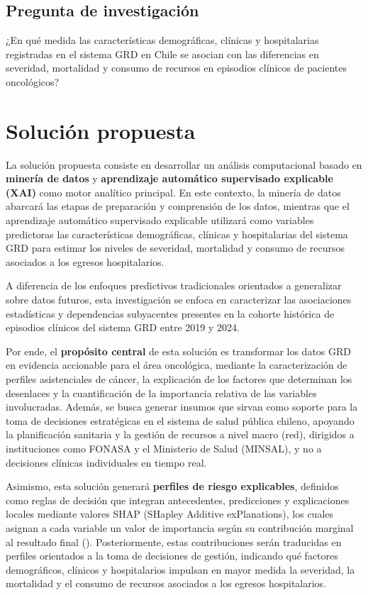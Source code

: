 \subsection{Pregunta de investigación}
\label{intro:pregunta_investigacion}
¿En qué medida las características demográficas, clínicas y hospitalarias registradas en el sistema GRD en Chile se asocian con las diferencias en severidad, mortalidad y consumo de recursos en episodios clínicos de pacientes oncológicos?

\section{Soluci\'on propuesta}
\label{intro:solucion}
La solución propuesta consiste en desarrollar un análisis computacional basado en \textbf{minería de datos} y \textbf{aprendizaje automático supervisado explicable (XAI)} como motor analítico principal. En este contexto, la minería de datos abarcará las etapas de preparación y comprensión de los datos, mientras que el aprendizaje automático supervisado explicable utilizará como variables predictoras las características demográficas, clínicas y hospitalarias del sistema GRD para estimar los niveles de severidad, mortalidad y consumo de recursos asociados a los egresos hospitalarios.

A diferencia de los enfoques predictivos tradicionales orientados a generalizar sobre datos futuros, esta investigación se enfoca en caracterizar las asociaciones estadísticas y dependencias subyacentes presentes en la cohorte histórica de episodios clínicos del sistema GRD entre 2019 y 2024.

Por ende, el \textbf{propósito central} de esta solución es transformar los datos GRD en evidencia accionable para el área oncológica, mediante la caracterización de perfiles asistenciales de cáncer, la explicación de los factores que determinan los desenlaces y la cuantificación de la importancia relativa de las variables involucradas. Además, se busca generar insumos que sirvan como soporte para la toma de decisiones estratégicas en el sistema de salud pública chileno, apoyando la planificación sanitaria y la gestión de recursos a nivel macro (red), dirigidos a instituciones como FONASA y el Ministerio de Salud (MINSAL), y no a decisiones clínicas individuales en tiempo real.


Asimismo, esta solución generará \textbf{perfiles de riesgo explicables}, definidos como reglas de decisión que integran antecedentes, predicciones y explicaciones locales mediante valores SHAP (SHapley Additive exPlanations), los cuales asignan a cada variable un valor de importancia según su contribución marginal al resultado final (\cite{lundberg2017shap}). Posteriormente, estas contribuciones serán traducidas en perfiles orientados a la toma de decisiones de gestión, indicando qué factores demográficos, clínicos y hospitalarios impulsan en mayor medida la severidad, la mortalidad y el consumo de recursos asociados a los egresos hospitalarios.


